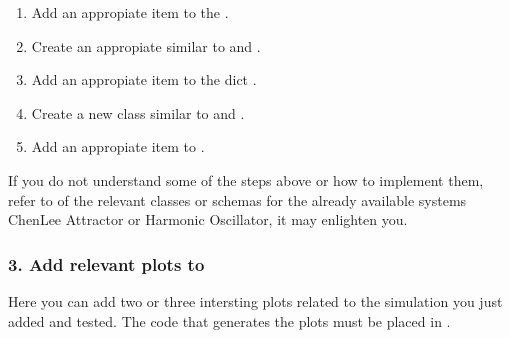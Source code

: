 \documentclass[a4paper,landscape,10pt,english]{sphinxmanual}
\begin{document}
\begin{enumerate}
\item {} 
Add an appropiate item to the 
{\hyperref[\detokenize{code_docs/simulation_API.controller:simulation_API.controller.schemas.SimSystem_to_SimParams}]{}}.

\item {} 
Create an appropiate  similar to
{\hyperref[\detokenize{code_docs/simulation_API.controller:simulation_API.controller.schemas.params_mapping_HO}]{}} and
{\hyperref[\detokenize{code_docs/simulation_API.controller:simulation_API.controller.schemas.params_mapping_ChenLee}]{}}.

\item {} 
Add an appropiate item to the dict
{\hyperref[\detokenize{code_docs/simulation_API.controller:simulation_API.controller.schemas.system_to_params_dict}]{}}.

\item {} 
Create a new class similar to
{\hyperref[\detokenize{code_docs/simulation_API.controller:simulation_API.controller.schemas.PlotQueryValues_HO}]{}} and
{\hyperref[\detokenize{code_docs/simulation_API.controller:simulation_API.controller.schemas.PlotQueryValues_ChenLee}]{}}.

\item {} 
Add an appropiate item to {\hyperref[\detokenize{code_docs/simulation_API.controller:simulation_API.controller.schemas.PlotQueryValues}]{}}.

\end{enumerate}

If you do not understand some of the steps above or how to implement them, refer
to {\hyperref[\detokenize{code_docs/simulation_API:code-api-package}]{}} of the relevant classes or schemas
for the already available systems \textendash{}Chen\sphinxhyphen{}Lee Attractor or Harmonic Oscillator\textendash{},
it may enlighten you.


\subsubsection{3. Add relevant plots to }
\label{\detokenize{code_docs/new_simulation:add-relevant-plots-to-plot-solution}}
Here you can add two or three intersting plots related to the simulation you
just added and tested. The code that generates the plots must be placed in
{\hyperref[\detokenize{code_docs/simulation_API.controller:simulation_API.controller.tasks._plot_solution}]{}}.
\end{document}
